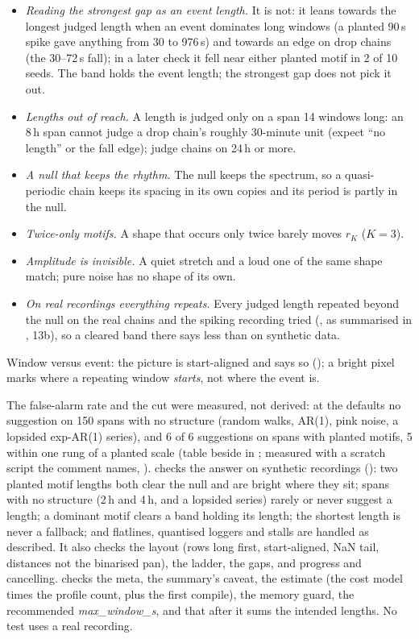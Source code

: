 \begin{itemize}
\item \emph{Reading the strongest gap as an event length.} It is not: it leans towards the longest
  judged length when an event dominates long windows (a planted 90\,s spike gave anything from 30 to
  976\,s) and towards an edge on drop chains (the 30--72\,s fall); in a later check it fell near
  either planted motif in 2 of 10 seeds. The band holds the event length; the strongest gap does
  not pick it out.
\item \emph{Lengths out of reach.} A length is judged only on a span 14 windows long: an 8\,h span
  cannot judge a drop chain's roughly 30-minute unit (expect ``no length'' or the fall edge); judge
  chains on 24\,h or more.
\item \emph{A null that keeps the rhythm.} The null keeps the spectrum, so a quasi-periodic chain
  keeps its spacing in its own copies and its period is partly in the null.
\item \emph{Twice-only motifs.} A shape that occurs only twice barely moves $r_K$ ($K = 3$).
\item \emph{Amplitude is invisible.} A quiet stretch and a loud one of the same shape match; pure
  noise has no shape of its own.
\item \emph{On real recordings everything repeats.} Every judged length repeated beyond the null on
  the real chains and the spiking recording tried
  (, as summarised in
  , 13b), so a cleared band there says less
  than on synthetic data.
\end{itemize}
Window versus event: the picture is start-aligned and says so (); a bright
pixel marks where a repeating window \emph{starts}, not where the event is.

The false-alarm rate and the cut were measured, not derived: at the defaults no suggestion on 150
spans with no structure (random walks, AR(1), pink noise, a lopsided exp-AR(1) series), and 6 of 6
suggestions on spans with planted motifs, 5 within one rung of a planted scale (table beside
 in ; measured with a scratch script the comment names, ).
 checks the answer on synthetic recordings
(): two planted motif lengths both clear the null and are bright where
they sit; spans with no structure (2\,h and 4\,h, and a lopsided series) rarely or never suggest a
length; a dominant motif clears a band holding its length; the shortest length is never a
fallback; and flatlines, quantised loggers and stalls are handled as described. It also checks the
layout (rows long first, start-aligned, NaN tail, distances not the binarised pan), the ladder, the
gaps, and progress and cancelling.  checks the
meta, the summary's caveat, the estimate (the cost model times the profile count, plus the first
compile), the memory guard, the recommended \emph{max\_window\_s}, and that
 after it sums the intended lengths. No test uses a real
recording.

